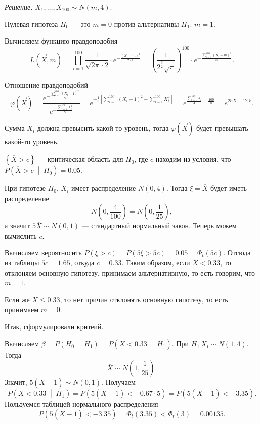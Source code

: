 \textit{Решение.} $X_1, \dotsc, X_{100} \sim N \left( m, 4 \right) $.

Нулевая гипотеза $H_0$ --- это $m = 0$ против альтернативы $H_1: \, m = 1$.

Вычисляем функцию правдоподобия
$$L \left( \vec{X}, m \right) =
  \prod \limits_{i = 1}^{100}
    \frac{1}{ \sqrt{2 \pi } \cdot 2} \cdot e^{- \frac{ \left( X_i - m \right)^2}{2 \cdot 4}} =
  \left( \frac{1}{2^{ \frac{3}{2}} \sqrt{ \pi }} \right)^{100} \cdot
  e^{- \frac{ \sum \limits_{i = 1}^{100} \left( X_i - m \right)^2}{8}}.$$

Отношение правдоподобий
$$ \varphi \left( \vec{X} \right) =
  \frac{e^{- \frac{ \sum \limits_{i = 1}^{100} \left( X_i - 1 \right)^2}{8}}}{e^{- \frac{ \sum \limits_{i = 1}^{100} X_i^2}{8}}} =
  e^{- \frac{1}{8} \left[ \sum \limits_{i = 1}^{100} \left( X_i - 1 \right)^2 + \sum \limits_{i = 1}^{100} X_i^2 \right] } =
  e^{ \frac{ \sum \limits_{i = 1}^{100} X_i}{4} - \frac{100}{8}} =
  e^{25 \overline{X} - 12.5}.$$

Сумма $X_i$ должна превысить какой-то уровень,
тогда $ \varphi \left( \vec{X} \right) $ будет превышать какой-то уровень.

$ \left\{ \overline{X} > c \right\} $ --- критическая область для $H_0$, где $c$ находим из условия,
что $P \left( \overline{X} > c \; \middle| \; H_0 \right) = 0.05$.

При гипотезе $H_0, \, X_i$ имеет распределение $N \left( 0, 4 \right) $.
Тогда $ \xi = \overline{X}$ будет иметь распределение
$$N \left( 0, \frac{4}{100} \right) =
  N \left( 0, \frac{1}{25} \right),$$
а значит $5 \overline{X} \sim N \left( 0, 1 \right) $ --- стандартный нормальный закон.
Теперь можем вычислить $c$.

Вычисляем вероятносить
$P \left( \xi > c \right) =
  P \left( 5 \xi > 5c \right) =
  0.05 =
  \Phi_t \left( 5c \right) $.
Отсюда из таблицы $5c = 1.65$, откуда $c = 0.33$.
Таким образом, если $ \overline{X} < 0.33$, то отклоняем основную гипотезу,
принимаем альтернативную, то есть говорим, что $m = 1$.

Если же $ \overline{X} \leq 0.33$, то нет причин отклонять основную гипотезу,
то есть принимаем $m = 0$.

Итак, сформулировали критеий.

Вычисляем
$ \beta =
  P \left( H_0 \; \middle| \; H_1 \right) =
  P \left( \overline{X} < 0.33 \; \middle| \; H_1 \right) $.
При $H_1 \, X_i \sim N \left( 1, 4 \right) $.
Тогда
$$ \overline{X} \sim
  N \left( 1, \frac{1}{25} \right).$$
Значит, $5 \left( \overline{X} - 1 \right) \sim N \left( 0, 1 \right) $.
Получаем
$$P \left( \overline{X} < 0.33 \; \middle| \; H_1 \right) =
  P \left( 5 \left( \overline{X} - 1 \right) < -0.67 \cdot 5 \right) =
  P \left( 5 \left( \overline{X} - 1 \right) < -3.35 \right).$$
Пользуемся таблицей нормального распределения
$$P \left( 5 \left( \overline{X} - 1 \right) < -3.35 \right) =
  \Phi_t \left( 3.35 \right) <
  \Phi_t \left( 3 \right) =
  0.00135.$$

